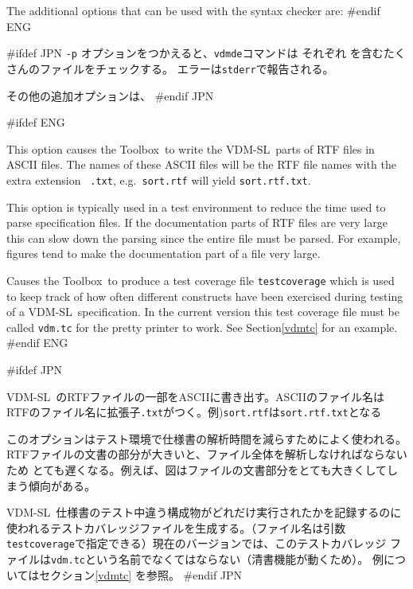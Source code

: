 \documentclass[\pformat,12pt]{article}
\newcommand{\vdmslpp}{VDM-SL}
\newcommand{\Toolbox}{Toolbox}
\newcommand{\vdmde}{vdmde}
\newcommand{\vdmslpp}{VDM++}
\newcommand{\Toolbox}{Toolbox}
\newcommand{\vdmde}{vppde}
\newcommand{\aaa}{\tt }
\begin{document}
The additional options that can be used with the syntax checker are:
#endif ENG

#ifdef JPN
{\tt -p} オプションをつかえると、{\tt \vdmde}コマンドは
それぞれ
を含むたくさんのファイルをチェックする。
エラーは{\aaa stderr}で報告される。

その他の追加オプションは、
#endif JPN

\begin{description}
#ifdef ENG
\item[{\tt -w}] This option causes the \Toolbox\ to write the
  \vdmslpp\ parts of RTF files in ASCII files. The names of these
  ASCII files will be the RTF file names with the extra extension {\tt
    .txt}, e.g.\ {\tt sort.rtf} will yield {\tt sort.rtf.txt}.
  
  This option is typically used in a test environment to reduce the
  time used to parse specification files. If the documentation parts
  of RTF files are very large this can slow down the parsing since
  the entire file must be parsed. For example, figures tend to make the
  documentation part of a file very large.

\item[{\tt -R}] Causes the \Toolbox\ to produce a test coverage file
  {\tt testcoverage} which is used to keep track of how often different
  constructs have been exercised during testing of a \vdmslpp\ 
  specification. In the current version this test coverage file must
  be called {\tt vdm.tc} for the pretty printer to work.  See
  Section\ref{vdmtc} for an example.
#endif ENG

#ifdef JPN
\item[{\tt -w}]
   \vdmslpp\ のRTFファイルの一部をASCIIに書き出す。ASCIIのファイル名は
  RTFのファイル名に拡張子{\tt .txt}がつく。例){\tt sort.rtf}は{\tt sort.rtf.txt}となる

  このオプションはテスト環境で仕様書の解析時間を減らすためによく使われる。
  RTFファイルの文書の部分が大きいと、ファイル全体を解析しなければならないため
  とても遅くなる。例えば、図はファイルの文書部分をとても大きくしてしまう傾向がある。

\item[{\tt -R}]
   \vdmslpp\ 仕様書のテスト中違う構成物がどれだけ実行されたかを記録するのに
  使われるテストカバレッジファイルを生成する。（ファイル名は引数
  {\tt testcoverage}で指定できる）現在のバージョンでは、このテストカバレッジ
  ファイルは{\tt vdm.tc}という名前でなくてはならない（清書機能が動くため）。
  例についてはセクション\ref{vdmtc} を参照。
#endif JPN
\end{description}
\end{document}
